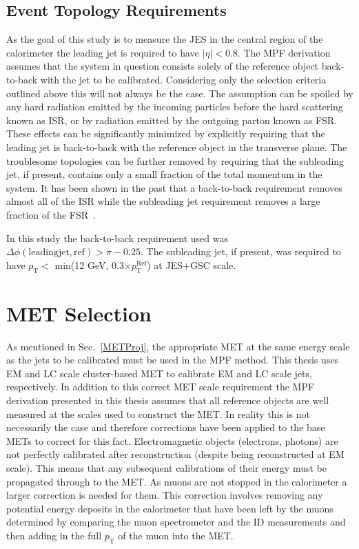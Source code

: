
\subsection{Event Topology Requirements}
\label{Sec:EventTopology}
As the goal of this study is to measure the \gls{JES} in the central region of the calorimeter the leading jet is required to have $\mid\eta\mid<$0.8.  
The MPF derivation assumes that the system in question consists solely of the reference object back-to-back with the jet to be calibrated.  
Considering only the selection criteria outlined above this will not always be the case.  
The assumption can be spoiled by any hard radiation emitted by the incoming particles before the hard scattering known as \gls{ISR}, or by radiation emitted by the outgoing parton known as \gls{FSR}.  
These effects can be significantly minimized by explicitly requiring that the leading jet is back-to-back with the reference object in the transverse plane.  
The troublesome topologies can be further removed by requiring that the subleading jet, if present, contains only a small fraction of the total momentum in the system.  
It has been shown in the past that a back-to-back requirement removes almost all of the ISR while the subleading jet requirement removes a large fraction of the FSR~\cite{DougPHD}.  

In this study the back-to-back requirement used was $\Delta \phi \left({\mathrm {leading jet, ref}}\right)>\pi-0.25$.  
The subleading jet, if present, was required to have $p_{\mathrm T}<$ min(12 GeV, 0.3$\times p_{\mathrm T}^{\mathrm {Ref}}$) at JES+GSC scale.  


\section{MET Selection}
As mentioned in Sec.~\ref{METProj}, the appropriate MET at the same energy scale as the jets to be calibrated must be used in the MPF method.  
This thesis uses EM and LC scale cluster-based MET to calibrate EM and LC scale jets, respectively.  
In addition to this correct MET scale requirement the MPF derivation presented in this thesis assumes that all reference objects are well measured at the scales used to construct the MET.  
In reality this is not necessarily the case and therefore corrections have been applied to the base METs to correct for this fact.  
Electromagnetic objects (electrons, photons) are not perfectly calibrated after reconstruction (despite being reconstructed at EM scale).  
This means that any subsequent calibrations of their energy must be propagated through to the MET.  
As muons are not stopped in the calorimeter a larger correction is needed for them.  
This correction involves removing any potential energy deposits in the calorimeter that have been left by the muons determined by comparing the muon spectrometer and the ID measurements and then adding in the full $p_{\mathrm T}$ of the muon into the MET.  


